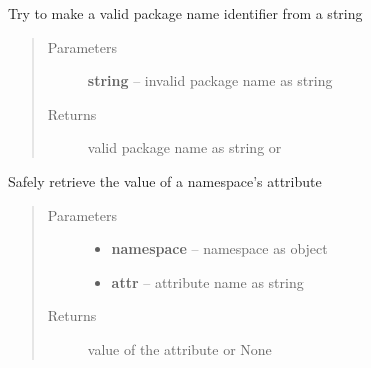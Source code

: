 \documentclass[letterpaper,10pt,english]{sphinxmanual}
\begin{document}

\begin{fulllineitems}
\label{_rst/pyscaffold:pyscaffold.utils.make_valid_identifier}
Try to make a valid package name identifier from a string
\begin{quote}\begin{description}
\item[{Parameters}] \leavevmode
\textbf{string} -- invalid package name as string

\item[{Returns}] \leavevmode
valid package name as string or 

\end{description}\end{quote}

\end{fulllineitems}


\begin{fulllineitems}
\label{_rst/pyscaffold:pyscaffold.utils.safe_get}
Safely retrieve the value of a namespace's attribute
\begin{quote}\begin{description}
\item[{Parameters}] \leavevmode\begin{itemize}
\item {} 
\textbf{namespace} -- namespace as \href{http://docs.python.org/2.7/library/argparse.html\#argparse.Namespace}{} object

\item {} 
\textbf{attr} -- attribute name as string

\end{itemize}

\item[{Returns}] \leavevmode
value of the attribute or None

\end{description}\end{quote}

\end{fulllineitems}

\end{document}
